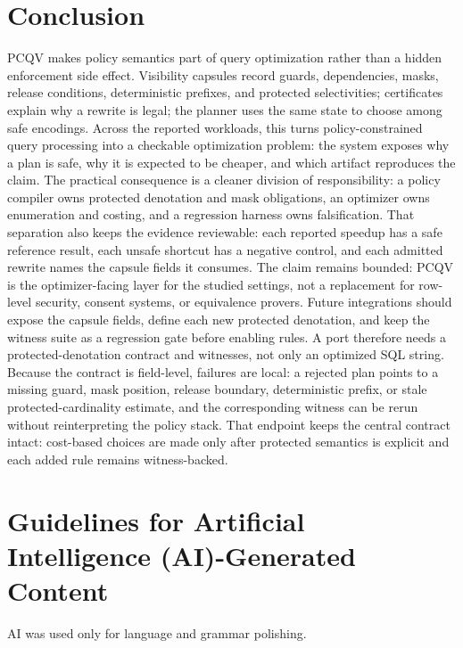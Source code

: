 \documentclass[conference]{IEEEtran}
\newcommand{\pcqv}{PCQV}
\begin{document}
\section{Conclusion}
\pcqv{} makes policy semantics part of query optimization rather than a hidden enforcement side effect. Visibility capsules record guards, dependencies, masks, release conditions, deterministic prefixes, and protected selectivities; certificates explain why a rewrite is legal; the planner uses the same state to choose among safe encodings. Across the reported workloads, this turns policy-constrained query processing into a checkable optimization problem: the system exposes why a plan is safe, why it is expected to be cheaper, and which artifact reproduces the claim. The practical consequence is a cleaner division of responsibility: a policy compiler owns protected denotation and mask obligations, an optimizer owns enumeration and costing, and a regression harness owns falsification. That separation also keeps the evidence reviewable: each reported speedup has a safe reference result, each unsafe shortcut has a negative control, and each admitted rewrite names the capsule fields it consumes. The claim remains bounded: \pcqv{} is the optimizer-facing layer for the studied settings, not a replacement for row-level security, consent systems, or equivalence provers. Future integrations should expose the capsule fields, define each new protected denotation, and keep the witness suite as a regression gate before enabling rules. A port therefore needs a protected-denotation contract and witnesses, not only an optimized SQL string. Because the contract is field-level, failures are local: a rejected plan points to a missing guard, mask position, release boundary, deterministic prefix, or stale protected-cardinality estimate, and the corresponding witness can be rerun without reinterpreting the policy stack. That endpoint keeps the central contract intact: cost-based choices are made only after protected semantics is explicit and each added rule remains witness-backed.

\clearpage

\section*{Guidelines for Artificial Intelligence (AI)-Generated Content}
AI was used only for language and grammar polishing.



\end{document}
